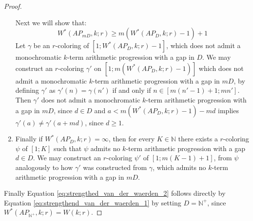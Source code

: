 \begin{proof}
\begin{enumerate}
		      Next we will show that:
		      \begin{equation*}
			      W^{*}(AP_{mD}, k; r) \geq m(W^{*}(AP_D, k; r) - 1) + 1
		      \end{equation*}
		      Let $\gamma$ be an $r$-coloring of $[1; W^{*}(AP_D, k; r) - 1]$, which does not admit a monochromatic $k$-term arithmetic progression with a gap in $D$.
		      We may construct an $r$-coloring $\gamma'$ on $[1; m(W^{*}(AP_D, k; r) - 1)]$ which does not admit a monochromatic $k$-term arithmetic progression with a gap in $mD$, by defining $\gamma'$ as $\gamma'(n) = \gamma(n')$ if and only if $n \in [m(n' -1) + 1; mn']$.
		      Then $\gamma'$ does not admit a monochromatic $k$-term arithmetic progression with a gap in $mD$, since $d \in D$ and $a < m(W^{*}(AP_D, k; r) - 1) - md$ implies $\gamma'(a) \neq \gamma'(a + md)$, since $d \geq 1$.
		\item Finally if $W^{*}(AP_D, k; r) = \infty$, then for every $K \in \mathbb{N}$ there exists a $r$-coloring $\psi$ of $[1; K]$ such that $\psi$ admits no $k$-term arithmetic progression with a gap $d \in D$. We may construct an $r$-coloring $\psi'$ of $[1; m(K - 1) + 1]$, from $\psi$ analogously to how $\gamma'$ was constructed from $\gamma$, which admits no $k$-term arithmetic progression with a gap in $mD$.
	\end{enumerate}
	Finally Equation \eqref{eq:strengthed_van_der_waerden_2} follows directly by Equation \eqref{eq:strengthend_van_der_waerden_1} by setting $D = \mathbb{N}^{+}$, since $W^{*}(AP_{\mathbb{N}^+}, k; r) = W(k; r)$.
\end{proof}

\newpage



